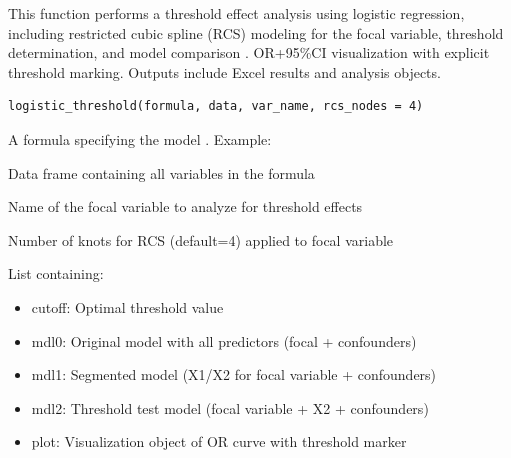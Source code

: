 \documentclass[a4paper]{book}
\begin{document}
%
\begin{Description}
This function performs a threshold effect analysis using logistic regression,
including restricted cubic spline (RCS) modeling for the focal variable,
threshold determination, and model comparison .
OR+95\%CI visualization with explicit threshold marking.
Outputs include Excel results and analysis objects.
\end{Description}
%
\begin{Usage}
\begin{verbatim}
logistic_threshold(formula, data, var_name, rcs_nodes = 4)
\end{verbatim}
\end{Usage}
%
\begin{Arguments}
\begin{ldescription}
\item[\code{formula}] A formula specifying the model .
Example: 

\item[\code{data}] Data frame containing all variables in the formula

\item[\code{var\_name}] Name of the focal variable to analyze for threshold effects

\item[\code{rcs\_nodes}] Number of knots for RCS (default=4) applied to focal variable
\end{ldescription}
\end{Arguments}
%
\begin{Value}
List containing:
\begin{itemize}

\item{} cutoff: Optimal threshold value
\item{} mdl0: Original model with all predictors (focal + confounders)
\item{} mdl1: Segmented model (X1/X2 for focal variable + confounders)
\item{} mdl2: Threshold test model (focal variable + X2 + confounders)
\item{} plot: Visualization object of OR curve with threshold marker

\end{itemize}

\end{Value}
\printindex{}
\end{document}
